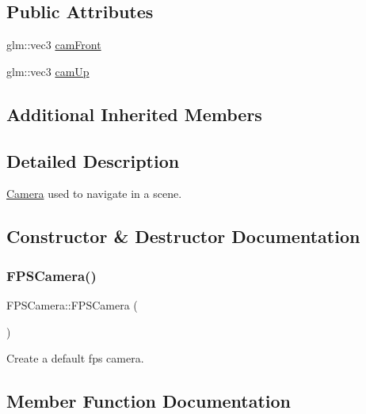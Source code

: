 \subsection*{Public Attributes}
\begin{DoxyCompactItemize}
\item 
glm\+::vec3 \hyperlink{classFPSCamera_a0f5edc21e058e893866ab7479b275a9a}{cam\+Front}
\item 
glm\+::vec3 \hyperlink{classFPSCamera_aa0ec22bd80a3e35f6b2ae12f830c07c4}{cam\+Up}
\end{DoxyCompactItemize}
\subsection*{Additional Inherited Members}


\subsection{Detailed Description}
\hyperlink{classCamera}{Camera} used to navigate in a scene. 

\subsection{Constructor \& Destructor Documentation}
\mbox{\label{classFPSCamera_a4176f2807be12da32763f66ba55b9621}} 
\subsubsection{\texorpdfstring{F\+P\+S\+Camera()}{FPSCamera()}}
{\footnotesize\ttfamily F\+P\+S\+Camera\+::\+F\+P\+S\+Camera (\begin{DoxyParamCaption}{ }\end{DoxyParamCaption})}



Create a default fps camera. 



\subsection{Member Function Documentation}
\mbox{\label{classFPSCamera_a420a19fa966d3a9caceb81a519419780}} 
